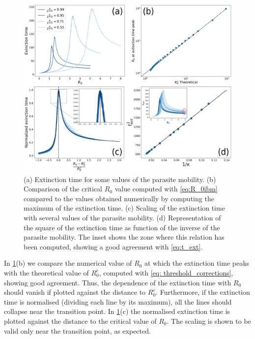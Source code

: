 \begin{figure}[H]
    \centering
    \includegraphics[width=\textwidth]{Figures/Extinction_time.png}
    \caption[
        Analysis of the extinction time of the epidemic]{(a) Extinction time
        for some values of the parasite mobility.
        (b) Comparison of the critical $R_0$ value computed with
        \cref{eq:R_0ibm}
        compared to the values obtained numerically by computing the maximum of
        the
        extinction time. (c) Scaling of the extinction time with several values
        of the
        parasite mobility. (d) Representation of the square of the extinction
        time as
        function of the inverse of the parasite mobility. The inset shows the
        zone
        where this relation has been computed, showing a good agreement with
        \cref{eq:t_ext}.}
    \label{fig:extinction_time}
\end{figure}

In \cref{fig:extinction_time}(b) we compare the numerical value of $R_0$ at
which the extinction time peaks with the theoretical value of $R_0^c$, computed
with \cref{eq: threshold_corrections}, showing good agreement. Thus, the
dependence of the extinction time with $R_0$ should vanish if plotted against
the distance to $R_0^c$. Furthermore, if the extinction time is normalised
(dividing each line by its maximum), all the lines should collapse near the
transition point. In \cref{fig:extinction_time}(c) the normalised extinction
time is plotted against the distance to the critical value of $R_0$. The
scaling is shown to be valid only near the transition point, as expected.

